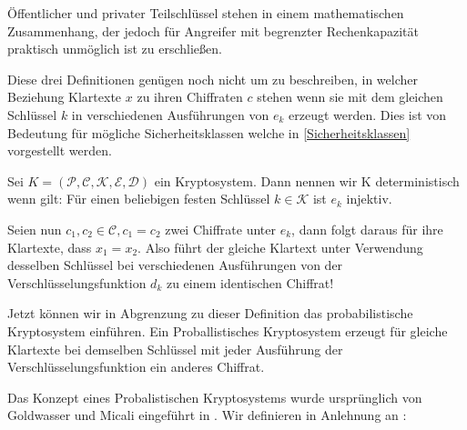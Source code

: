 Öffentlicher und privater Teilschlüssel stehen in einem mathematischen Zusammenhang, der jedoch für Angreifer mit begrenzter Rechenkapazität praktisch unmöglich ist zu erschließen.

Diese drei Definitionen genügen noch nicht um zu beschreiben, in welcher Beziehung Klartexte $x$ zu ihren Chiffraten $c$ stehen wenn sie mit dem gleichen Schlüssel $k$ in verschiedenen Ausführungen von $e_k$ erzeugt werden. Dies ist von Bedeutung für mögliche Sicherheitsklassen welche in \ref{Sicherheitsklassen} vorgestellt werden.

\begin{theorem}[Deterministisches Kryptosytem]
	Sei $K = (\mathcal{P},\mathcal{C},\mathcal{K},\mathcal{E},\mathcal{D})$ ein Kryptosystem. Dann nennen wir K deterministisch wenn gilt: Für einen beliebigen festen Schlüssel $k\in\mathcal{K}$ ist $e_k$ injektiv. %
\end{theorem}

Seien nun $c_1,c_2\in\mathcal{C}, c_1= c_2$ zwei Chiffrate unter $e_k$, dann folgt daraus für ihre Klartexte, dass $x_1= x_2$. Also führt der gleiche Klartext unter Verwendung desselben Schlüssel bei verschiedenen Ausführungen von der Verschlüsselungsfunktion $d_k$ zu einem identischen Chiffrat!

Jetzt können wir in Abgrenzung zu dieser Definition das probabilistische Kryptosystem einführen. Ein Proballistisches Kryptosystem erzeugt für gleiche Klartexte bei demselben Schlüssel mit jeder Ausführung der Verschlüsselungsfunktion ein
anderes Chiffrat.

Das Konzept eines Probalistischen Kryptosystems wurde ursprünglich von Goldwasser und Micali eingeführt in \cite{goldwasser1984probabilistic}. Wir definieren in Anlehnung an \cite[p.345]{stinson2006cryptography}:


